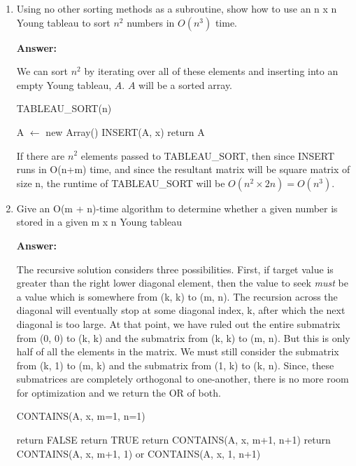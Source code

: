 \documentclass[]{book}
\theoremstyle{definition}
\begin{document}
\begin{enumerate}
    \item Using no other sorting methods as a subroutine, show how to use an n x n Young tableau to sort $n^2$ numbers
          in $O(n^3)$ time.
    
    \textbf{Answer:}

    We can sort $n^2$ by iterating over all of these elements and inserting into an empty Young tableau, $A$.
    $A$ will be a sorted array.

    \begin{algorithm}[h]
    \begin{algorithmic}[1]
        \caption{TABLEAU\_SORT(n)}
        \STATE A $\leftarrow$ new Array()
            \STATE INSERT(A, x)
        \ENDFOR
        \STATE return A
    \end{algorithmic}
    \end{algorithm}

    If there are $n^2$ elements passed to TABLEAU\_SORT, then since INSERT runs in O(n+m) time, and
    since the resultant matrix will be square matrix of size n, the runtime of TABLEAU\_SORT will be
    $O(n^2 \times 2n) = O(n^3)$.

    \item Give an O(m + n)-time algorithm to determine whether a given number is stored in a given m x n Young tableau
    
    \textbf{Answer:}

    The recursive solution considers three possibilities. First, if target value is greater than the 
    right lower diagonal element, then the value to seek \textit{must} be a value which is 
    somewhere from (k, k) to (m, n). The recursion across the diagonal will eventually stop at some diagonal
    index, k, after which the next diagonal is too large.
    At that point, we have ruled out the entire submatrix from (0, 0) to (k, k) and the
    submatrix from (k, k) to (m, n). But this is only half of all the elements in the matrix.
    We must still consider the submatrix from (k, 1) to (m, k) and the submatrix from (1, k) to (k, n). Since,
    these submatrices are completely orthogonal to one-another, there is no more room
    for optimization and we return the OR of both.

    \begin{algorithm}[h]
    \begin{algorithmic}[1]
        \caption{CONTAINS(A, x, m=1, n=1)}
            \STATE return FALSE
        \ENDIF
            \STATE return TRUE
        \ENDIF
            \STATE return CONTAINS(A, x, m+1, n+1)
        \ENDIF
        \STATE return CONTAINS(A, x, m+1, 1) or CONTAINS(A, x, 1, n+1)
    \end{algorithmic}
    \end{algorithm}


\end{enumerate}
\end{document}
